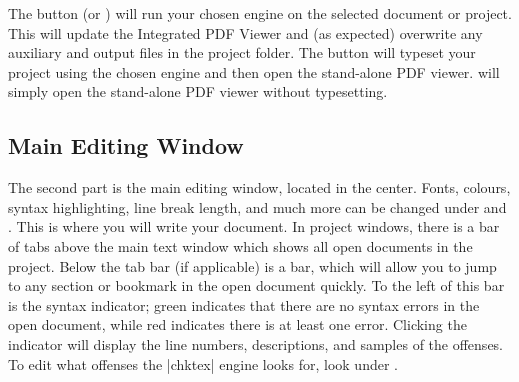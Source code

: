 The  button (or ) will run your chosen engine on the selected document or project. This will update the Integrated PDF Viewer and (as expected) overwrite any auxiliary and output files in the project folder. The  button will typeset your project using the chosen engine and then open the stand-alone PDF viewer.  will simply open the stand-alone PDF viewer without typesetting.

\subsection{Main Editing Window}

The second part is the main editing window, located in the center. Fonts, colours, syntax highlighting, line break length, and much more can be changed under  and . This is where you will write your document. In project windows, there is a bar of tabs above the main text window which shows all open documents in the project. Below the tab bar (if applicable) is a  bar, which will allow you to jump to any section or bookmark in the open document quickly. To the left of this bar is the syntax indicator; green indicates that there are no syntax errors in the open document, while red indicates there is at least one error. Clicking the indicator will display the line numbers, descriptions, and samples of the offenses. To edit what offenses the |chktex| engine looks for, look under .

